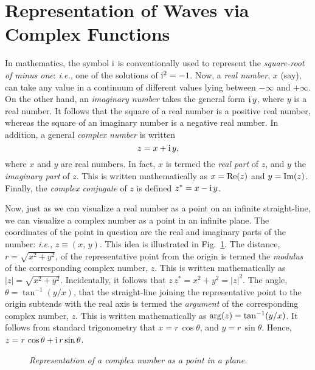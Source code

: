 \section{Representation of Waves via Complex Functions}
In mathematics, the symbol ${\rm i}$ is conventionally used to represent the {\em square-root of minus one}: {\em i.e.}, one of the
solutions of ${\rm i}^2 = -1$. Now, a {\em real number}, $x$ (say), can take any value in a continuum of different values lying between $-\infty$ and $+\infty$. 
On the other hand, an {\em imaginary number}\/ takes the general form ${\rm i}\,y$, where $y$ is a real number. It follows that the square of
a real number is a positive real number, whereas the square of an imaginary number is a negative real number. In addition, a general {\em complex number}\/ is written
\begin{equation}
z = x + {\rm i}\,y,
\end{equation}
where $x$ and $y$ are real numbers. In fact, $x$ is termed the {\em real part}\/ of $z$, and $y$ 
the {\em imaginary part}\/ of $z$. This is written mathematically as $x={\rm Re}(z)$ and $y={\rm Im}(z)$. 
Finally, the {\em complex conjugate}\/ of $z$ is defined $z^\ast = x-{\rm i}\,y$.

Now, just as we
can visualize a real number as a point on an infinite straight-line, we can visualize a complex number as
a point in an infinite plane. The coordinates of the point in question are the real and imaginary
parts of the number: {\em i.e.}, $z\equiv (x,\,y)$. This idea is illustrated in Fig.~\ref{f13.2}. 
The distance, $r=\sqrt{x^2+y^2}$, of the representative point from the origin is termed the {\em modulus}\/
of the corresponding complex number, $z$. This is written mathematically as $|z|=\sqrt{x^2+y^2}$.  Incidentally, it follows that $z\,z^\ast = x^2 + y^2=|z|^2$. 
The angle, $\theta=\tan^{-1}(y/x)$,  that the straight-line joining the representative point to the origin subtends with the 
real axis is termed the {\em argument}\/ of the corresponding complex number, $z$. This is written mathematically
as ${\rm arg}(z)=\tan^{-1}(y/x)$. It follows from standard trigonometry that $x=r\,\cos\theta$, and $y=r\,\sin\theta$.
Hence, $z= r\,\cos\theta+ {\rm i}\,r\sin\theta$. 

\begin{figure}
\epsfysize=3.25in
\centerline{}
\caption{\em Representation of a complex number as a point in a plane.}\label{f13.2}   
\end{figure}

